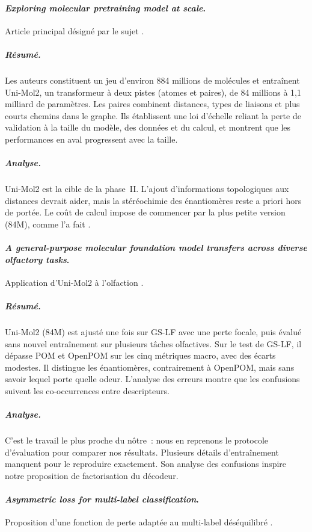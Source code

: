 \paragraph{\emph{Exploring molecular pretraining model at scale}.}
Article principal désigné par le sujet \cite{Ji-2024}.

\subparagraph{Résumé.}
Les auteurs constituent un jeu d'environ 884 millions de molécules et entraînent Uni-Mol2, un transformeur à deux pistes (atomes et paires), de 84 millions à 1,1 milliard de paramètres.
Les paires combinent distances, types de liaisons et plus courts chemins dans le graphe.
Ils établissent une loi d'échelle reliant la perte de validation à la taille du modèle, des données et du calcul, et montrent que les performances en aval progressent avec la taille.

\subparagraph{Analyse.}
Uni-Mol2 est la cible de la phase~II.
L'ajout d'informations topologiques aux distances devrait aider, mais la stéréochimie des énantiomères reste a priori hors de portée.
Le coût de calcul impose de commencer par la plus petite version (84M), comme l'a fait \cite{Han-2026}.

\paragraph{\emph{A general-purpose molecular foundation model transfers across diverse olfactory tasks}.}
Application d'Uni-Mol2 à l'olfaction \cite{Han-2026}.

\subparagraph{Résumé.}
Uni-Mol2 (84M) est ajusté une fois sur GS-LF avec une perte focale, puis évalué sans nouvel entraînement sur plusieurs tâches olfactives.
Sur le test de GS-LF, il dépasse POM et OpenPOM sur les cinq métriques macro, avec des écarts modestes.
Il distingue les énantiomères, contrairement à OpenPOM, mais sans savoir lequel porte quelle odeur.
L'analyse des erreurs montre que les confusions suivent les co-occurrences entre descripteurs.

\subparagraph{Analyse.}
C'est le travail le plus proche du nôtre~: nous en reprenons le protocole d'évaluation pour comparer nos résultats.
Plusieurs détails d'entraînement manquent pour le reproduire exactement.
Son analyse des confusions inspire notre proposition de factorisation du décodeur.

\paragraph{\emph{Asymmetric loss for multi-label classification}.}
Proposition d'une fonction de perte adaptée au multi-label déséquilibré \cite{Ridnik-2021}.

